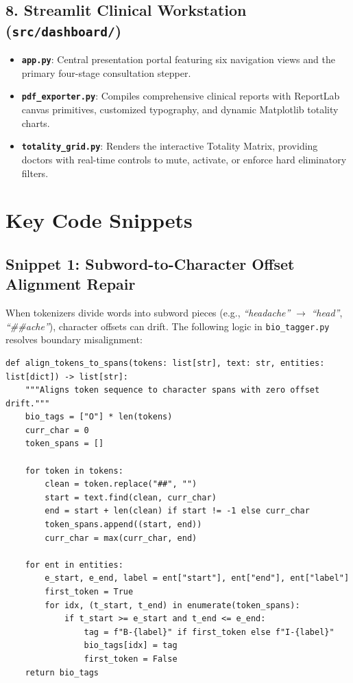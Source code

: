 \subsection{8. Streamlit Clinical Workstation (\texttt{src/dashboard/})}
\begin{itemize}
  \item \textbf{\texttt{app.py}}: Central presentation portal featuring six navigation views and the primary four-stage consultation stepper.
  \item \textbf{\texttt{pdf\_exporter.py}}: Compiles comprehensive clinical reports with ReportLab canvas primitives, customized typography, and dynamic Matplotlib totality charts.
  \item \textbf{\texttt{totality\_grid.py}}: Renders the interactive Totality Matrix, providing doctors with real-time controls to mute, activate, or enforce hard eliminatory filters.
\end{itemize}


\section{Key Code Snippets}

\subsection{Snippet 1: Subword-to-Character Offset Alignment Repair}
When tokenizers divide words into subword pieces (e.g., \textit{``headache''} $\to$ \textit{``head''}, \textit{``\#\#ache''}), character offsets can drift. The following logic in \texttt{bio\_tagger.py} resolves boundary misalignment:

\begin{lstlisting}[style=python, caption={Subword Offset Alignment Repair Algorithm}]
def align_tokens_to_spans(tokens: list[str], text: str, entities: list[dict]) -> list[str]:
    """Aligns token sequence to character spans with zero offset drift."""
    bio_tags = ["O"] * len(tokens)
    curr_char = 0
    token_spans = []
    
    for token in tokens:
        clean = token.replace("##", "")
        start = text.find(clean, curr_char)
        end = start + len(clean) if start != -1 else curr_char
        token_spans.append((start, end))
        curr_char = max(curr_char, end)
        
    for ent in entities:
        e_start, e_end, label = ent["start"], ent["end"], ent["label"]
        first_token = True
        for idx, (t_start, t_end) in enumerate(token_spans):
            if t_start >= e_start and t_end <= e_end:
                tag = f"B-{label}" if first_token else f"I-{label}"
                bio_tags[idx] = tag
                first_token = False
    return bio_tags
\end{lstlisting}

